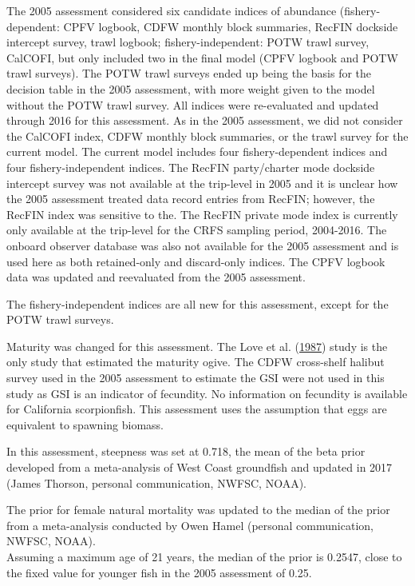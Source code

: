 \documentclass[12pt,]{article}
\begin{document}
The 2005 assessment considered six candidate indices of abundance
(fishery-dependent: CPFV logbook, CDFW monthly block summaries, RecFIN
dockside intercept survey, trawl logbook; fishery-independent: POTW
trawl survey, CalCOFI, but only included two in the final model (CPFV
logbook and POTW trawl surveys). The POTW trawl surveys ended up being
the basis for the decision table in the 2005 assessment, with more
weight given to the model without the POTW trawl survey. All indices
were re-evaluated and updated through 2016 for this assessment. As in
the 2005 assessment, we did not consider the CalCOFI index, CDFW monthly
block summaries, or the trawl survey for the current model. The current
model includes four fishery-dependent indices and four
fishery-independent indices. The RecFIN party/charter mode dockside
intercept survey was not available at the trip-level in 2005 and it is
unclear how the 2005 assessment treated data record entries from RecFIN;
however, the RecFIN index was sensitive to the. The RecFIN private mode
index is currently only available at the trip-level for the CRFS
sampling period, 2004-2016. The onboard observer database was also not
available for the 2005 assessment and is used here as both retained-only
and discard-only indices. The CPFV logbook data was updated and
reevaluated from the 2005 assessment.

The fishery-independent indices are all new for this assessment, except
for the POTW trawl surveys.

Maturity was changed for this assessment. The Love et al.
(\protect\hyperlink{ref-Love1987}{1987}) study is the only study that
estimated the maturity ogive. The CDFW cross-shelf halibut survey used
in the 2005 assessment to estimate the GSI were not used in this study
as GSI is an indicator of fecundity. No information on fecundity is
available for California scorpionfish. This assessment uses the
assumption that eggs are equivalent to spawning biomass.

In this assessment, steepness was set at 0.718, the mean of the beta
prior developed from a meta-analysis of West Coast groundfish and
updated in 2017 (James Thorson, personal communication, NWFSC, NOAA).

The prior for female natural mortality was updated to the median of the
prior from a meta-analysis conducted by Owen Hamel (personal
communication, NWFSC, NOAA).\\
Assuming a maximum age of 21 years, the median of the prior is 0.2547,
close to the fixed value for younger fish in the 2005 assessment of
0.25.
\end{document}
